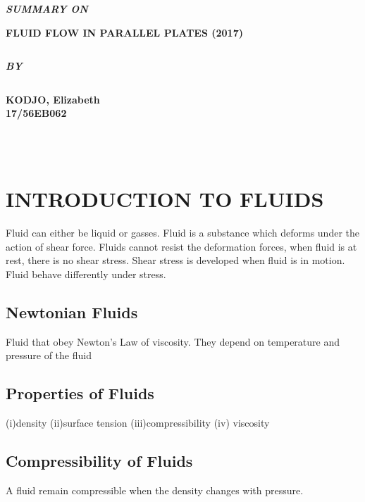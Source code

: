 \documentclass[12pt]{report}
\newcommand{\sps}{\\[0.2cm]}
\begin{document}
	\clearpage
	\thispagestyle{empty}
	\begin{center}
		\textbf{\itshape SUMMARY ON}
	\end{center} 
	\begin{center}
		{\bf \Large FLUID FLOW IN PARALLEL PLATES (2017)}
	\end{center}
	$$$$
	\vspace{3cm}
	\begin{center}
		\textbf{\itshape BY}
	\end{center} 
	$$$$
	\vspace{2cm}
	\begin{center}
		{\bf KODJO, Elizabeth\\
			17/56EB062}
	\end{center}
	$$$$
	\\ \\
	\newpage
	
	\chapter{INTRODUCTION TO FLUIDS}
	Fluid can either be liquid or gasses. Fluid is a substance which deforms under the action of shear force. Fluids cannot resist the deformation forces, when fluid is at rest, there is no shear stress. Shear stress is developed when fluid is in motion.\sps
	Fluid behave differently under stress.
	
	\section{Newtonian Fluids}
	Fluid that obey Newton's Law of viscosity. They depend on temperature and pressure of the fluid
	
	\section{Properties of Fluids}
	(i)density (ii)surface tension (iii)compressibility (iv) viscosity
	
	\section{Compressibility of Fluids}
	A fluid remain compressible when the density changes with pressure.
	
\end{document}
